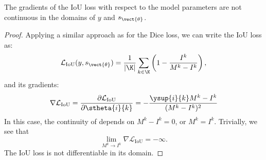 \begin{theorem}
    The gradients of the IoU loss with respect to the model parameters are not continuous in the domains of $y$ and $s_{\vect{\theta}}$.
\end{theorem}
\begin{proof}
    Applying a similar approach as for the Dice loss, we can write the IoU loss as:
    \begin{equation*}
        \mathcal{L}_\text{IoU}(y, s_{\vect{\theta}}) = \dfrac{1}{|\K|}\sum_{k\in\K}\left(1 - \dfrac{I^k}{M^k - I^k}\right),
    \end{equation*}
    and its gradients:
    \begin{equation}
        \nabla \mathcal{L}_\text{IoU} = \dfrac{\partial \mathcal{L}_\text{IoU}}{\partial \stheta{i}{k}} = - \dfrac{\ysup{i}{k}M^k - I^k}{(M^k-I^k)^2}
        \label{eq:app_iouloss_proof}
    \end{equation}
    In this case, the continuity of  depends on $M^k-I^k = 0$, or $M^k= I^k$. Trivially, we see that
    \begin{equation*}
        \lim_{M^k\rightarrow I^k}\nabla \mathcal{L}_\text{IoU} = - \infty.
    \end{equation*}
    The IoU loss is not differentiable in its domain.    
\end{proof}